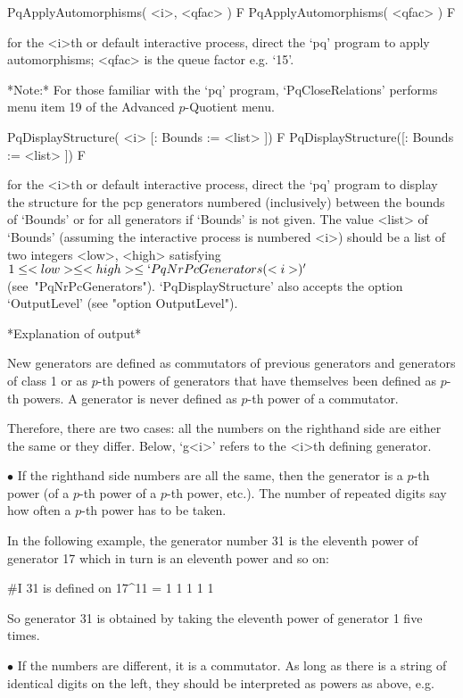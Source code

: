 \>PqApplyAutomorphisms( <i>, <qfac> ) F
\>PqApplyAutomorphisms( <qfac> ) F

for the <i>th or default interactive {\ANUPQ} process,  direct  the  `pq'
program to apply automorphisms; <qfac> is the queue factor e.g. `15'.

*Note:* 
For those familiar with  the  `pq'  program,  `PqCloseRelations'  performs
menu item 19 of the Advanced $p$-Quotient menu.

\>PqDisplayStructure( <i> [: Bounds := <list> ]) F
\>PqDisplayStructure([: Bounds := <list> ]) F

for the <i>th or default interactive {\ANUPQ} process,  direct  the  `pq'
program  to  display  the  structure  for  the  pcp  generators   numbered
(inclusively) between the bounds of `Bounds' or  for  all  generators  if
`Bounds' is not  given.  The  value  <list>  of  `Bounds'  (assuming  the
interactive process is numbered <i>) should be a  list  of  two  integers
<low>,   <high>   satisfying   $1    \le    <low>    \le    <high>    \le
`PqNrPcGenerators(<i>)'$  (see~"PqNrPcGenerators").  `PqDisplayStructure'
also accepts the option `OutputLevel' (see "option OutputLevel").

*Explanation of output*

New generators are defined as  commutators  of  previous  generators  and
generators of class 1  or  as  $p$-th  powers  of  generators  that  have
themselves been defined as $p$-th powers. A generator is never defined as
$p$-th power of a commutator.

Therefore, there are two cases: all the numbers on the righthand side are
either the same or  they  differ.  Below,  `g<i>'  refers  to  the  <i>th
defining generator.

\beginlist%

\item{$\bullet$}
If the righthand side numbers are all the same, then the generator  is  a
$p$-th power (of a $p$-th power of a $p$-th power, etc.). The  number  of
repeated digits say how often a $p$-th power has to be taken.

In the following example, the generator number 31 is the  eleventh  power
of generator 17 which in turn is an eleventh power and so on:

\begintt
#I  31 is defined on 17^11 = 1 1 1 1 1 
\endtt
                    
So generator 31 is obtained by taking the eleventh power of  generator  1
five times.

\item{$\bullet$}
If the numbers are different, it is a commutator. As long as there  is  a
string of identical digits on the left, they  should  be  interpreted  as
powers as above, e.g.

